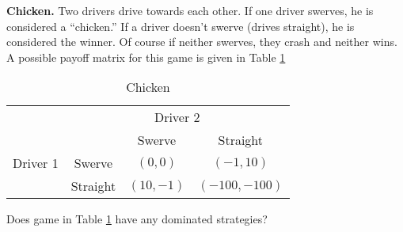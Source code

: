\begin{example}\label{E:Chicken}\textbf{Chicken.}
Two drivers drive towards each other. If one driver swerves, he is considered a ``chicken.'' If a driver doesn't swerve (drives straight), he is considered the winner. Of course if neither swerves, they crash and neither wins. A possible payoff matrix for this game is given in Table \ref{T:chicken}



\begin{table}[h]
\centering

\begin{tabular}{cccc}
                      & \multicolumn{3}{c}{Driver 2}                                                  \\ \cline{2-4} 
\multicolumn{1}{l|}{} & \multicolumn{1}{l|}{} & \multicolumn{1}{c|}{Swerve} & \multicolumn{1}{c|}{Straight} \\ \cline{2-4} 
\multicolumn{1}{l|}{Driver 1} & \multicolumn{1}{c|}{Swerve} & \multicolumn{1}{c|}{$(0, 0)$} & \multicolumn{1}{c|}{$(-1, 10)$} \\ \cline{2-4} 
\multicolumn{1}{l|}{} & \multicolumn{1}{c|}{Straight} & \multicolumn{1}{c|}{$(10, -1)$} & \multicolumn{1}{c|}{$(-100, -100)$} \\ \cline{2-4} 
\end{tabular}
\caption{Chicken}
\label{T:chicken}
\end{table}
\end{example}



\begin{xca}\label{E:Cdomstrat}
Does game in Table \ref{T:chicken} have any dominated strategies?
\end{xca}

